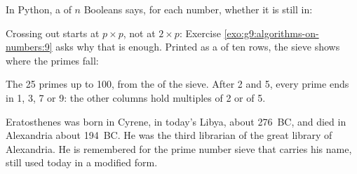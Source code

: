 In Python, a  of $n$ Booleans says, for each number, whether it is still in:

\label{lst:g9:algorithms-on-numbers:sieve}

\label{out:g9:algorithms-on-numbers:sieve}

Crossing out starts at $p \times p$, not at $2 \times p$: Exercise
\ref{exo:g9:algorithms-on-numbers:9} asks why that is enough. Printed as a
 of ten rows, the sieve shows where the primes fall:

\label{lst:g9:algorithms-on-numbers:grid}

\label{out:g9:algorithms-on-numbers:grid}


\begin{omfigure}

{\small The 25 primes up to 100, from the  of the sieve. After 2 and 5,
every prime ends in 1, 3, 7 or 9: the other columns hold multiples of 2 or of 5.}
\end{omfigure}

\begin{history}
Eratosthenes was born in Cyrene, in today's Libya, about 276~BC, and died in
Alexandria about 194~BC. He was the third librarian of the great library of
Alexandria. He is remembered for the
prime number sieve that carries his name, still used today in a modified form.
\end{history}


